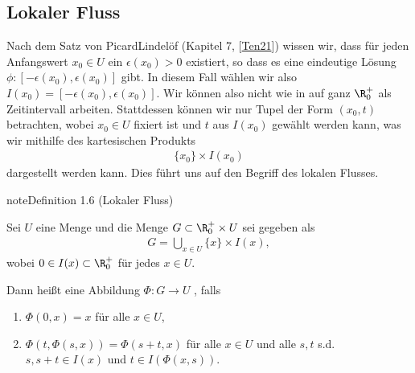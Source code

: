 \documentclass[letterpaper,10pt,english]{jupyterBook}
\begin{document}
\subsection{Lokaler Fluss}
\label{\detokenize{ode/fluesse:lokaler-fluss}}
\sphinxAtStartPar
Nach dem Satz von Picard\sphinxhyphen{}Lindelöf (Kapitel 7, {[}\hyperlink{cite.references:id10}{Ten21}{]}) wissen wir, dass für jeden Anfangswert \(x_0\in U\) ein \(\epsilon(x_0)>0\) existiert, so dass es eine eindeutige Lösung \(\phi: [-\epsilon(x_0), \epsilon(x_0)]\) gibt. In diesem Fall wählen wir also \(I(x_0)=[-\epsilon(x_0), \epsilon(x_0)]\). Wir können also nicht wie in {\hyperref[\detokenize{ode/fluesse:def:Fluss}]{}} auf ganz \(\R^+_0\) als Zeitintervall arbeiten. Stattdessen können wir nur Tupel der Form \((x_0, t)\) betrachten, wobei \(x_0\in U\) fixiert ist und \(t\) aus \(I(x_0)\) gewählt werden kann, was wir mithilfe des kartesischen Produkts
\begin{align*}
\{x_0\}\times I(x_0)
\end{align*}
\sphinxAtStartPar
dargestellt werden kann. Dies führt uns auf den Begriff des lokalen Flusses.
\label{ode/fluesse:def:LokFluss}
\begin{sphinxadmonition}{note}{Definition 1.6 (Lokaler Fluss)}



\sphinxAtStartPar
Sei \(U\) eine Menge und die Menge \(G\subset \R^+_0\times U\) sei gegeben als
\begin{equation*}
\begin{split}G = \bigcup_{x\in U} \{x\}\times I(x),\end{split}
\end{equation*}
\sphinxAtStartPar
wobei \(0\in I(x)\subset \R^+_0\) für jedes \(x\in U\).

\sphinxAtStartPar
Dann heißt eine Abbildung \(\Phi: G\rightarrow U\) , falls
\begin{enumerate}
%
\item {} 
\sphinxAtStartPar
\(\Phi(0,x) = x\) für alle \(x\in U\),

\item {} 
\sphinxAtStartPar
\(\Phi(t, \Phi(s, x)) = \Phi(s+t, x)\) für alle \(x\in U\) und alle \(s,t\) s.d. \(s, s+t\in I(x)\) und \(t\in I(\Phi(x,s))\).

\end{enumerate}
\end{sphinxadmonition}
\end{document}
